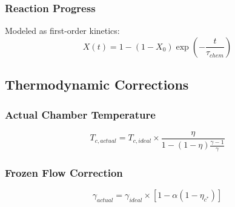 \subsubsection{Reaction Progress}
Modeled as first-order kinetics:
\begin{equation}
X(t) = 1 - (1 - X_0) \exp\left(-\frac{t}{\tau_{chem}}\right)
\end{equation}

\subsection{Thermodynamic Corrections}

\subsubsection{Actual Chamber Temperature}
\begin{equation}
T_{c,actual} = T_{c,ideal} \times \frac{\eta}{1 - (1-\eta) \frac{\gamma-1}{\gamma}}
\end{equation}

\subsubsection{Frozen Flow Correction}
\begin{equation}
\gamma_{actual} = \gamma_{ideal} \times [1 - \alpha (1 - \eta_{c^*})]
\end{equation}

